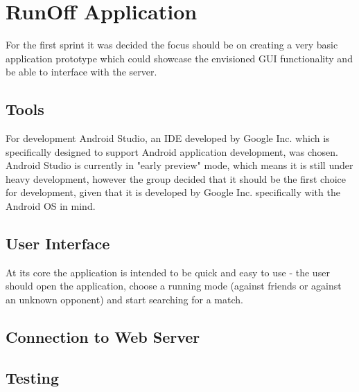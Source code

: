 \section{RunOff Application}
For the first sprint it was decided the focus should be on creating a very basic application prototype which could showcase the envisioned \ac{GUI} functionality and be able to interface with the server. 

\subsection{Tools}
For development Android Studio, an \ac{IDE} developed by Google Inc. which is specifically designed to support Android application development, was chosen. Android Studio is currently in "early preview" mode, which means it is still under heavy development, however the group decided that it should be the first choice for development, given that it is developed by Google Inc. specifically with the Android OS in mind.  

\subsection{User Interface}
At its core the application is intended to be quick and easy to use - the user should open the application, choose a running mode (against friends or against an unknown opponent) and start searching for a match. 

\subsection{Connection to Web Server}

\subsection{Testing}